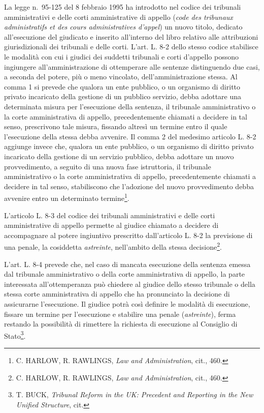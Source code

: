 \documentclass[12pt,it,a4paper,]{report}
\begin{document}
La legge n.~95-125 del 8 febbraio 1995 ha introdotto nel codice dei
tribunali amministrativi e delle corti amministrative di appello
(\emph{code des tribunaux administratifs et des cours administratives
d'appel}) un nuovo titolo, dedicato all'esecuzione del giudicato e
inserito all'interno del libro relativo alle attribuzioni
giurisdizionali dei tribunali e delle corti. L'art. L. 8-2 dello stesso
codice stabilisce le modalità con cui i giudici dei suddetti tribunali e
corti d'appello possono ingiungere all'amministrazione di ottemperare
alle sentenze distinguendo due casi, a seconda del potere, più o meno
vincolato, dell'amministrazione stessa. Al comma 1 si prevede che
qualora un ente pubblico, o un organismo di diritto privato incaricato
della gestione di un pubblico servizio, debba adottare una determinata
misura per l'esecuzione della sentenza, il tribunale amministrativo o la
corte amministrativa di appello, precedentemente chiamati a decidere in
tal senso, prescrivono tale misura, fissando altresì un termine entro il
quale l'esecuzione della stessa debba avvenire. Il comma 2 del medesimo
articolo L. 8-2 aggiunge invece che, qualora un ente pubblico, o un
organismo di diritto privato incaricato della gestione di un servizio
pubblico, debba adottare un nuovo provvedimento, a seguito di una nuova
fase istruttoria, il tribunale amministrativo o la corte amministrativa
di appello, precedentemente chiamati a decidere in tal senso,
stabiliscono che l'adozione del nuovo provvedimento debba avvenire entro
un determinato termine\footnote{C. HARLOW, R. RAWLINGS, \emph{Law and
  Administration}, cit., 460.}.

L'articolo L. 8-3 del codice dei tribunali amministrativi e delle corti
amministrative di appello permette al giudice chiamato a decidere di
accompagnare al potere ingiuntivo prescritto dall'articolo L. 8-2 la
previsione di una penale, la cosiddetta \emph{astreinte}, nell'ambito
della stessa decisione\footnote{C. HARLOW, R. RAWLINGS, \emph{Law and
  Administration}, cit., 460.}.

L'art. L. 8-4 prevede che, nel caso di mancata esecuzione della sentenza
emessa dal tribunale amministrativo o della corte amministrativa di
appello, la parte interessata all'ottemperanza può chiedere al giudice
dello stesso tribunale o della stessa corte amministrativa di appello
che ha pronunciato la decisione di assicurarne l'esecuzione. Il giudice
potrà così definire le modalità di esecuzione, fissare un termine per
l'esecuzione e stabilire una penale (\emph{astreinte}), ferma restando
la possibilità di rimettere la richiesta di esecuzione al Consiglio di
Stato\footnote{T. BUCK, \emph{Tribunal Reform in the UK: Precedent and
  Reporting in the New Unified Structure}, cit.}.
\end{document}

